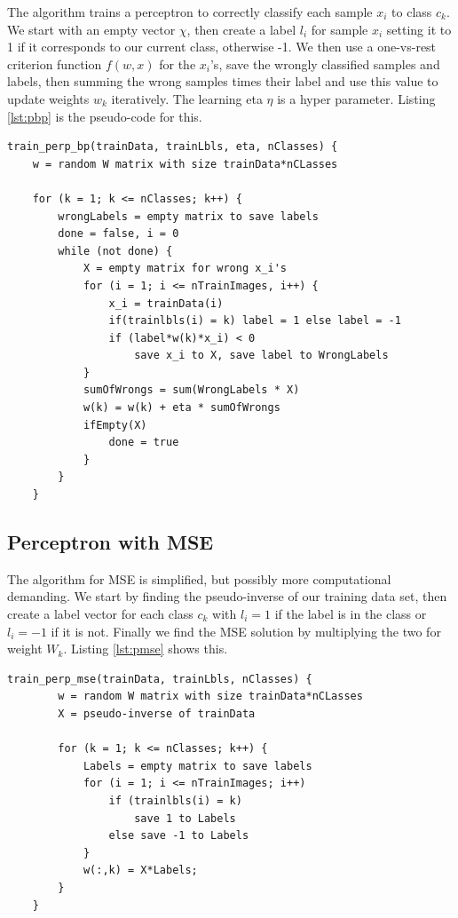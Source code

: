 \documentclass[journal]{IEEEtran}
\begin{document}
The algorithm trains a perceptron to correctly classify each sample $x_{i}$ to class $c_{k}$. We start with an empty vector $\chi$, then create a label $l_{i}$ for sample $x_{i}$ setting it to 1 if it corresponds to our current class, otherwise -1. We then use a one-vs-rest criterion function $f(w,x)$ for the $x_{i}$'s, save the wrongly classified samples and labels, then summing the wrong samples times their label and use this value to update weights $w_{k}$ iteratively. The learning eta $\eta$ is a hyper parameter. Listing \ref{lst:pbp} is the pseudo-code for this.

\begin{minipage}[H]{0.95\linewidth}
	\begin{lstlisting}[caption=Implementation of NSC., label={lst:pbp}]
	train_perp_bp(trainData, trainLbls, eta, nClasses) {
	w = random W matrix with size trainData*nCLasses
	
	for (k = 1; k <= nClasses; k++) {
		wrongLabels = empty matrix to save labels
		done = false, i = 0
		while (not done) {
			X = empty matrix for wrong x_i's
			for (i = 1; i <= nTrainImages, i++) {
				x_i = trainData(i)
				if(trainlbls(i) = k) label = 1 else label = -1
				if (label*w(k)*x_i) < 0
					save x_i to X, save label to WrongLabels
			}
			sumOfWrongs = sum(WrongLabels * X)
			w(k) = w(k) + eta * sumOfWrongs
			ifEmpty(X)
				done = true
			}
		}
	}
	\end{lstlisting}
\end{minipage}

\subsection{Perceptron with MSE} 

The algorithm for MSE is simplified, but possibly more computational demanding. We start by finding the pseudo-inverse of our training data set, then create a label vector for each class $c_{k}$ with $l_{i} = 1$ if the label is in the class or $l_{i} = -1$ if it is not. Finally we find the MSE solution by multiplying the two for weight $W_{k}$. Listing \ref{lst:pmse} shows this.

\begin{minipage}[H]{0.95\linewidth}
	\begin{lstlisting}[caption=Implementation of NSC., label={lst:pmse}]
	train_perp_mse(trainData, trainLbls, nClasses) {
		w = random W matrix with size trainData*nCLasses
		X = pseudo-inverse of trainData
		
		for (k = 1; k <= nClasses; k++) {
			Labels = empty matrix to save labels
			for (i = 1; i <= nTrainImages; i++)
				if (trainlbls(i) = k)
					save 1 to Labels
				else save -1 to Labels
			}
			w(:,k) = X*Labels;
		}
	}
	\end{lstlisting}
\end{minipage}
\end{document}
